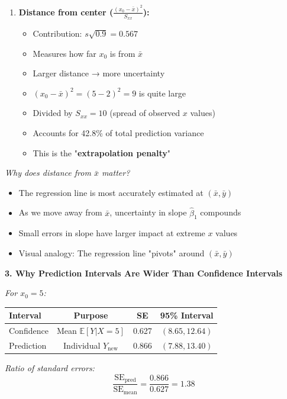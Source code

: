 \documentclass[12pt]{article}
\begin{document}
\begin{explanation}
\begin{enumerate}
    \item \textbf{Distance from center ($\frac{(x_0-\bar{x})^2}{S_{xx}}$):}
    \begin{itemize}
        \item Contribution: $s\sqrt{0.9} = 0.567$
        \item Measures how far $x_0$ is from $\bar{x}$
        \item Larger distance → more uncertainty
        \item $(x_0 - \bar{x})^2 = (5-2)^2 = 9$ is quite large
        \item Divided by $S_{xx} = 10$ (spread of observed $x$ values)
        \item Accounts for 42.8\% of total prediction variance
        \item This is the "\textbf{extrapolation penalty}"
    \end{itemize}
\end{enumerate}

\textit{Why does distance from $\bar{x}$ matter?}

\begin{itemize}
    \item The regression line is most accurately estimated at $(\bar{x}, \bar{y})$
    \item As we move away from $\bar{x}$, uncertainty in slope $\hat{\beta}_1$ compounds
    \item Small errors in slope have larger impact at extreme $x$ values
    \item Visual analogy: The regression line "pivots" around $(\bar{x}, \bar{y})$
\end{itemize}

\textbf{3. Why Prediction Intervals Are Wider Than Confidence Intervals}

\textit{For $x_0 = 5$:}

\begin{center}
\begin{tabular}{|l|c|c|c|}
\hline
\textbf{Interval} & \textbf{Purpose} & \textbf{SE} & \textbf{95\% Interval} \\
\hline
Confidence & Mean $\mathbb{E}[Y|X=5]$ & 0.627 & $(8.65, 12.64)$ \\
Prediction & Individual $Y_{\text{new}}$ & 0.866 & $(7.88, 13.40)$ \\
\hline
\end{tabular}
\end{center}

\textit{Ratio of standard errors:}
\[
\frac{\text{SE}_{\text{pred}}}{\text{SE}_{\text{mean}}} = \frac{0.866}{0.627} = 1.38
\]


\end{explanation}
\end{document}
